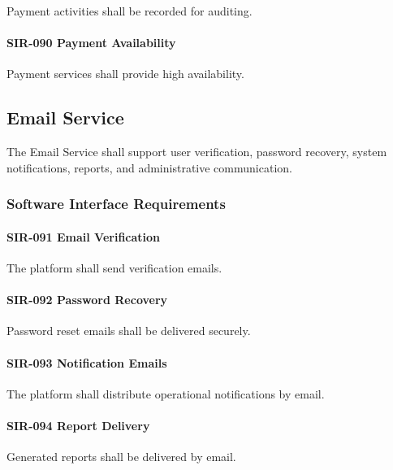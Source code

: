 Payment activities shall be recorded for auditing.

\paragraph{SIR-090 Payment Availability}

Payment services shall provide high availability.


\subsection{Email Service}

The Email Service shall support user verification, password recovery,
system notifications, reports, and administrative communication.


\subsubsection*{Software Interface Requirements}

\paragraph{SIR-091 Email Verification}

The platform shall send verification emails.

\paragraph{SIR-092 Password Recovery}

Password reset emails shall be delivered securely.

\paragraph{SIR-093 Notification Emails}

The platform shall distribute operational notifications by email.

\paragraph{SIR-094 Report Delivery}

Generated reports shall be delivered by email.

